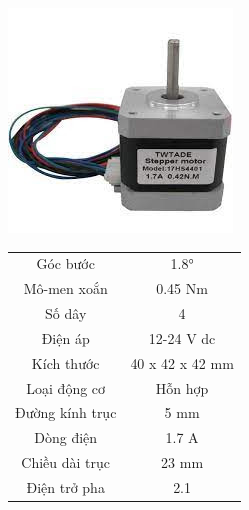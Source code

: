 \documentclass[12pt]{report}
\begin{document}
\begin{center}
    \begin{minipage}{0.45\textwidth}
        \centering
        \includegraphics[width=\textwidth]{image/step_motor.jpg}
    \end{minipage}
    \hspace{0.05\textwidth}
    \begin{minipage}{0.45\textwidth}
        \centering
        \begin{tabular}{|c|c|}
            \hline
            Góc bước & 1.8° \\
            Mô-men xoắn & 0.45 Nm \\
            Số dây & 4 \\
            Điện áp & 12-24 V dc \\
            Kích thước & 40 x 42 x 42 mm \\
            Loại động cơ & Hỗn hợp \\
            Đường kính trục & 5 mm \\
            Dòng điện & 1.7 A \\
            Chiều dài trục & 23 mm \\
            Điện trở pha & 2.1 \\
            \hline
        \end{tabular}
    \end{minipage}
\end{center}
\end{document}
